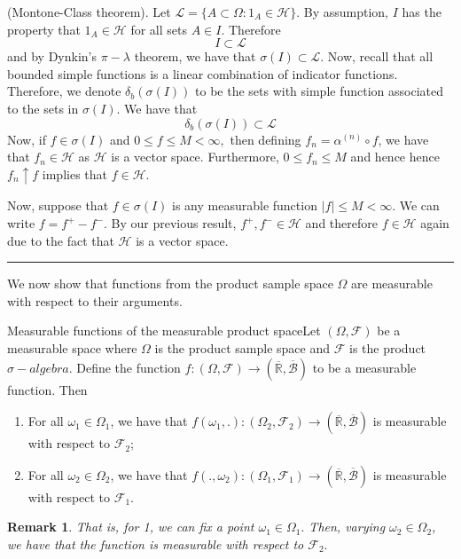 \documentclass[twoside]{article}
\newtheorem{remark}[theorem]{Remark}
\newenvironment{proof}{{\bf Proof:}}{\hfill\rule{2mm}{2mm}}
\newcommand{\sigmalgebra}{\mathcal{F}}
\newcommand{\borelsigmaalgebra}{\mathcal{B}}
\newcommand{\sa}{\sigma-algebra}
\newcommand{\extendedreal}{\overline{\mathbb{R}}}
\begin{document}
\begin{proof}(Montone-Class theorem). Let $\mathcal{L} = \{A \subset \Omega: 1_A \in \mathcal{H}\}.$ By assumption, $I$ has the property that $1_A \in \mathcal{H}$ for all sets $A \in I.$ Therefore 
$$
I \subset \mathcal{L}
$$
and by Dynkin's $\pi-\lambda$ theorem, we have that $\sigma(I) \subset \mathcal{L}.$ Now, recall that all bounded simple functions is a linear combination of indicator functions. Therefore, we denote $\delta_b(\sigma(I))$ to be the sets with simple function associated to the sets in $\sigma(I)$. We have that 
$$
\delta_b(\sigma(I)) \subset \mathcal{L}
$$
Now, if $f \in \sigma(I)$ and $0 \leq f \leq M < \infty,$ then defining $f_n = \alpha^{(n)}\circ f$, we have that $f_n \in \mathcal{H}$ as $\mathcal{H}$ is a vector space. Furthermore, $0 \leq f_n \leq M$ and hence hence $f_n \uparrow f$ implies that $f \in \mathcal{H}.$

Now, suppose that $f \in \sigma(I)$ is any measurable function $|f| \leq M < \infty.$ We can write $f = f^+ - f^-$. By our previous result, $f^+, f^- \in \mathcal{H}$ and therefore $f \in \mathcal{H}$ again due to the fact that $\mathcal{H}$ is a vector space.
\end{proof}

We now show that functions from the product sample space $\Omega$ are measurable with respect to their arguments.

\begin{proposition_exam}{Measurable functions of the measurable product space}{}Let $(\Omega, \sigmalgebra)$ be a measurable space where $\Omega$ is the product sample space and $\sigmalgebra$ is the product $\sa$. Define the function $f: (\Omega, \sigmalgebra) \rightarrow (\extendedreal, \overline{\borelsigmaalgebra})$ to be a measurable function. Then 
\begin{enumerate}
\item For all $\omega_1 \in \Omega_1$, we have that $f(\omega_1,.): (\Omega_2, \sigmalgebra_2) \rightarrow (\extendedreal, \overline{\borelsigmaalgebra})$ is measurable with respect to $\sigmalgebra_2$;
\item For all $\omega_2 \in \Omega_2$, we have that $f(.,\omega_2): (\Omega_1, \sigmalgebra_1) \rightarrow (\extendedreal, \overline{\borelsigmaalgebra})$ is measurable with respect to $\sigmalgebra_1$.
\end{enumerate}
\end{proposition_exam}

\begin{remark}That is, for 1, we can fix a point $\omega_1 \in \Omega_1.$ Then, varying $\omega_2 \in \Omega_2$, we have that the function is measurable with respect to $\sigmalgebra_2.$
\end{remark}
\end{document}
